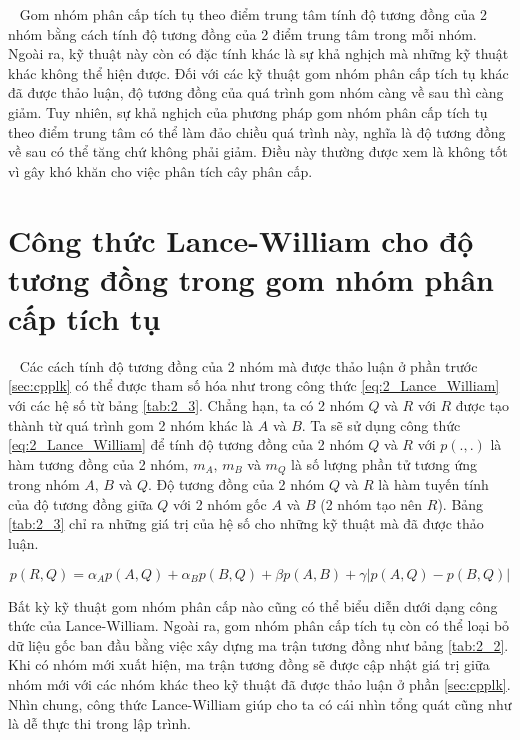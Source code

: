 ~\cite{Vipin-Kumar, AHC, hierarchical-clustering, centroid} Gom nhóm phân cấp tích tụ theo điểm trung tâm tính độ tương đồng của 2 nhóm bằng cách tính độ tương đồng của 2 điểm trung tâm trong mỗi nhóm.
Ngoài ra, kỹ thuật này còn có đặc tính khác là sự khả nghịch mà những kỹ thuật khác không thể hiện được.
Đối với các kỹ thuật gom nhóm phân cấp tích tụ khác đã được thảo luận, độ tương đồng của quá trình gom nhóm càng về sau thì càng giảm.
Tuy nhiên, sự khả nghịch của phương pháp gom nhóm phân cấp tích tụ theo điểm trung tâm có thể làm đảo chiều quá trình này, nghĩa là độ tương đồng về sau có thể tăng chứ không phải giảm.
Điều này thường được xem là không tốt vì gây khó khăn cho việc phân tích cây phân cấp.

\section{Công thức Lance-William cho độ tương đồng trong gom nhóm phân cấp tích tụ}
~\cite{Vipin-Kumar} Các cách tính độ tương đồng của 2 nhóm mà được thảo luận ở phần trước \ref{sec:cpplk} có thể được tham số hóa như trong công thức \ref{eq:2_Lance_William} với các hệ số từ bảng \ref{tab:2_3}.
Chẳng hạn, ta có 2 nhóm $Q$ và $R$ với $R$ được tạo thành từ quá trình gom 2 nhóm khác là $A$ và $B$.
Ta sẽ sử dụng công thức \ref{eq:2_Lance_William} để tính độ tương đồng của 2 nhóm $Q$ và $R$ với $p(.,.)$ là hàm tương đồng của 2 nhóm, $m_A, \, m_B$ và $m_Q$ là số lượng phần tử tương ứng trong nhóm $A, \, B$ và $Q$.
Độ tương đồng của 2 nhóm $Q$ và $R$ là hàm tuyến tính của độ tương đồng giữa $Q$ với 2 nhóm gốc $A$ và $B$ (2 nhóm tạo nên $R$).
Bảng \ref{tab:2_3} chỉ ra những giá trị của hệ số cho những kỹ thuật mà đã được thảo luận.

\begin{equation}
\label{eq:2_Lance_William}
p(R,Q)=\alpha_Ap(A,Q) + \alpha_Bp(B,Q) + \beta p(A,B) + \gamma |p(A, Q) - p(B, Q)|
\end{equation}

Bất kỳ kỹ thuật gom nhóm phân cấp nào cũng có thể biểu diễn dưới dạng công thức của Lance-William.
Ngoài ra, gom nhóm phân cấp tích tụ còn có thể loại bỏ dữ liệu gốc ban đầu bằng việc xây dựng ma trận tương đồng như bảng \ref{tab:2_2}.
Khi có nhóm mới xuất hiện, ma trận tương đồng sẽ được cập nhật giá trị giữa nhóm mới với các nhóm khác theo kỹ thuật đã được thảo luận ở phần \ref{sec:cpplk}.
Nhìn chung, công thức Lance-William giúp cho ta có cái nhìn tổng quát cũng như là dễ thực thi trong lập trình.

